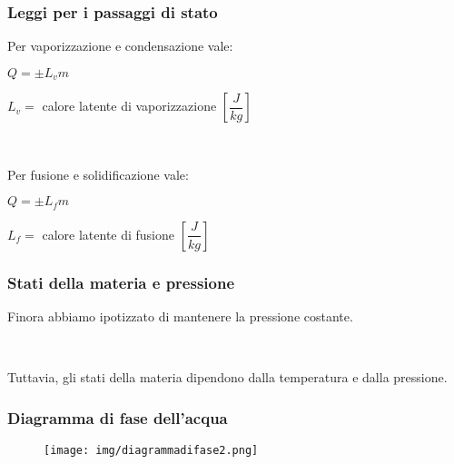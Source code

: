 \documentclass[]{beamer}
\theoremstyle{plain}
\begin{document}
\begin{frame}
\frametitle{Leggi per i passaggi di stato}
Per \alert<1>{vaporizzazione e condensazione} vale:
\begin{center}
\colorbox{marroncino!30}{$ Q = \pm L_v m $}


$ L_v = $ calore latente di vaporizzazione $ \left[ \dfrac{J}{kg} \right] $
\end{center}\pause

~

Per \alert<2>{fusione e solidificazione} vale:
\begin{center}
\colorbox{marroncino!30}{$ Q = \pm L_f m $}


$ L_f = $ calore latente di fusione $ \left[ \dfrac{J}{kg} \right] $
\end{center}
\end{frame}



\begin{frame}
\frametitle{Stati della materia e pressione}
Finora abbiamo ipotizzato di \alert<1>{mantenere la pressione costante}.\pause

~

Tuttavia, gli stati della materia \alert<2>{dipendono dalla temperatura e dalla pressione}.

\begin{center}
\href{video/Acqua.mp4}{}
\end{center}
\end{frame}


\begin{frame}
\frametitle{Diagramma di fase dell'acqua}
\begin{figure}
\texttt{[image: img/diagrammadifase2.png]}
\end{figure}
\end{frame}
\end{document}
